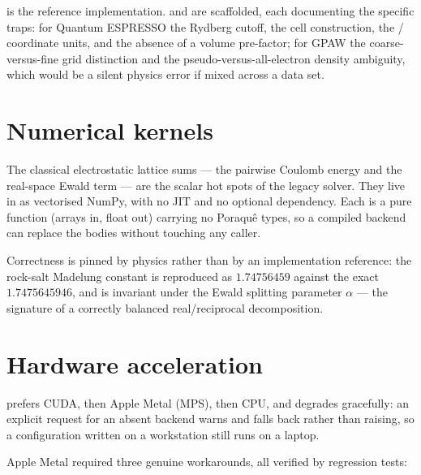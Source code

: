  is the reference implementation.
 and  are scaffolded, each
documenting the specific traps: for Quantum ESPRESSO the Rydberg cutoff,
the  cell construction, the / coordinate
units, and the absence of a volume pre-factor; for GPAW the coarse-versus-fine
grid distinction and the pseudo-versus-all-electron density ambiguity, which
would be a silent physics error if mixed across a data set.

\section{Numerical kernels}

The classical electrostatic lattice sums --- the pairwise Coulomb energy and
the real-space Ewald term --- are the scalar hot spots of the legacy solver.
They live in  as vectorised NumPy, with no
JIT and no optional dependency. Each is a pure function (arrays in, float out)
carrying no Poraqu\^e types, so a compiled backend can replace the bodies
without touching any caller.

\begin{ptip}
Correctness is pinned by physics rather than by an implementation reference:
the rock-salt Madelung constant is reproduced as $1.74756459$ against the exact
$1.7475645946$, and is invariant under the Ewald splitting parameter $\alpha$
--- the signature of a correctly balanced real/reciprocal decomposition.
\end{ptip}

\section{Hardware acceleration}
\label{sec:hardware}

 prefers CUDA, then Apple Metal (MPS), then CPU, and
degrades gracefully: an explicit request for an absent backend warns and falls
back rather than raising, so a configuration written on a workstation still runs
on a laptop.

Apple Metal required three genuine workarounds, all verified by regression
tests:


